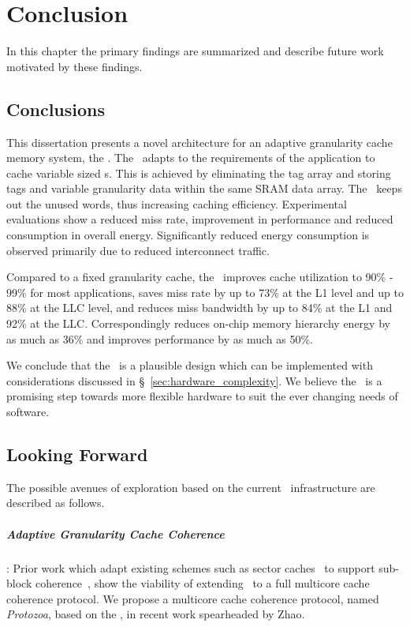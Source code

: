 
%
%

\chapter{Conclusion}
\label{chap:conclusions}

In this chapter the primary findings are summarized and describe future work motivated by these findings. 

\section{Conclusions}

This dissertation presents a novel architecture for an adaptive granularity cache memory system, the \AC{}. The \AC\ adapts to the requirements of the application to cache variable sized \AB{}s. This is achieved by eliminating the tag array and storing tags and variable granularity data within the same SRAM data array. The \AC\ keeps out the unused words, thus increasing caching efficiency. Experimental evaluations show a reduced miss rate, improvement in performance and reduced consumption in overall energy. Significantly reduced energy consumption is observed primarily due to reduced interconnect traffic.

Compared to a fixed granularity cache, the \AC\ improves cache utilization to 90\% - 99\% for most applications, saves miss rate by up to 73\% at the L1 level and up to 88\% at the LLC level, and reduces miss bandwidth by up to 84\% at the L1 and 92\% at the LLC. Correspondingly reduces on-chip memory hierarchy energy by as much as 36\% and improves performance by as much as 50\%.

We conclude that the \AC\ is a plausible design which can be implemented with considerations discussed in \S~\ref{sec:hardware_complexity}. We believe the \AC\ is a promising step towards more flexible hardware to suit the ever changing needs of software.

\section{Looking Forward}
The possible avenues of exploration based on the current \AC\ infrastructure are described as follows.

\paragraph{Adaptive Granularity Cache Coherence}: Prior work which adapt existing schemes such as sector caches~\cite{Rothman_Smith_2000} to support sub-block coherence~\cite{Subblock_Coherence,minerva}, show the viability of extending \AC\ to a full multicore cache coherence protocol. We propose a multicore cache coherence protocol, named \textit{Protozoa}, based on the \AC{}, in recent work spearheaded by Zhao\cite{protozoa}. 

